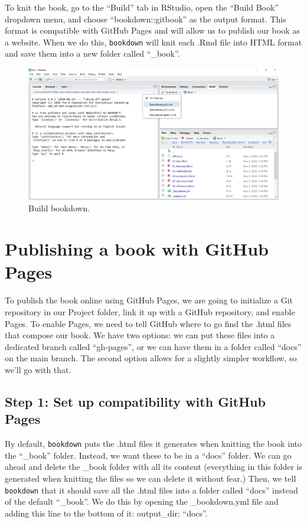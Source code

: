 \documentclass[
]{book}
\begin{document}
To knit the book, go to the ``Build'' tab in RStudio, open the ``Build Book'' dropdown menu, and choose ``bookdown::gitbook'' as the output format. This format is compatible with GitHub Pages and will allow us to publish our book as a website. When we do this, \texttt{bookdown} will knit each .Rmd file into HTML format and save them into a new folder called ``\_book''.

\begin{figure}
\centering
\includegraphics{img/build-bookdown.jpg}
\caption{Build bookdown.}
\end{figure}

\hypertarget{publishing-a-book-with-github-pages}{%
\section{Publishing a book with GitHub Pages}\label{publishing-a-book-with-github-pages}}

To publish the book online using GitHub Pages, we are going to initialize a Git repository in our Project folder, link it up with a GitHub repository, and enable Pages. To enable Pages, we need to tell GitHub where to go find the .html files that compose our book. We have two options: we can put these files into a dedicated branch called ``gh-pages'', or we can have them in a folder called ``docs'' on the main branch. The second option allows for a slightly simpler workflow, so we'll go with that.

\hypertarget{step-1-set-up-compatibility-with-github-pages}{%
\subsection{Step 1: Set up compatibility with GitHub Pages}\label{step-1-set-up-compatibility-with-github-pages}}

By default, \texttt{bookdown} puts the .html files it generates when knitting the book into the ``\_book'' folder. Instead, we want these to be in a ``docs'' folder. We can go ahead and delete the \_book folder with all its content (everything in this folder is generated when knitting the files so we can delete it without fear.) Then, we tell \texttt{bookdown} that it should save all the .html files into a folder called ``docs'' instead of the default ``\_book''. We do this by opening the \_bookdown.yml file and adding this line to the bottom of it: output\_dir: ``docs''.
\end{document}
